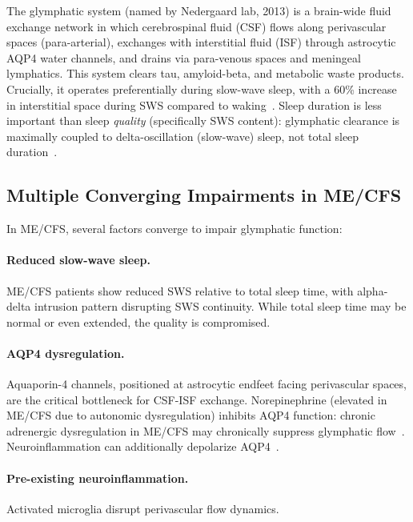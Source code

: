The glymphatic system (named by Nedergaard lab, 2013) is a brain-wide fluid exchange network in which cerebrospinal fluid (CSF) flows along perivascular spaces (para-arterial), exchanges with interstitial fluid (ISF) through astrocytic AQP4 water channels, and drains via para-venous spaces and meningeal lymphatics. This system clears tau, amyloid-beta, and metabolic waste products. Crucially, it operates preferentially during slow-wave sleep, with a 60\% increase in interstitial space during SWS compared to waking~\cite{Xie2013glymphatic}. Sleep duration is less important than sleep \emph{quality} (specifically SWS content): glymphatic clearance is maximally coupled to delta-oscillation (slow-wave) sleep, not total sleep duration~\cite{NematGorgani2025glymphatic}.

\subsection{Multiple Converging Impairments in ME/CFS}

In ME/CFS, several factors converge to impair glymphatic function:

\paragraph{Reduced slow-wave sleep.} ME/CFS patients show reduced SWS relative to total sleep time, with alpha-delta intrusion pattern disrupting SWS continuity. While total sleep time may be normal or even extended, the quality is compromised.

\paragraph{AQP4 dysregulation.} Aquaporin-4 channels, positioned at astrocytic endfeet facing perivascular spaces, are the critical bottleneck for CSF-ISF exchange. Norepinephrine (elevated in ME/CFS due to autonomic dysregulation) inhibits AQP4 function: chronic adrenergic dysregulation in ME/CFS may chronically suppress glymphatic flow~\cite{NematGorgani2025glymphatic}. Neuroinflammation can additionally depolarize AQP4~\cite{Ding2025glymphaticAD}.

\paragraph{Pre-existing neuroinflammation.} Activated microglia disrupt perivascular flow dynamics.

